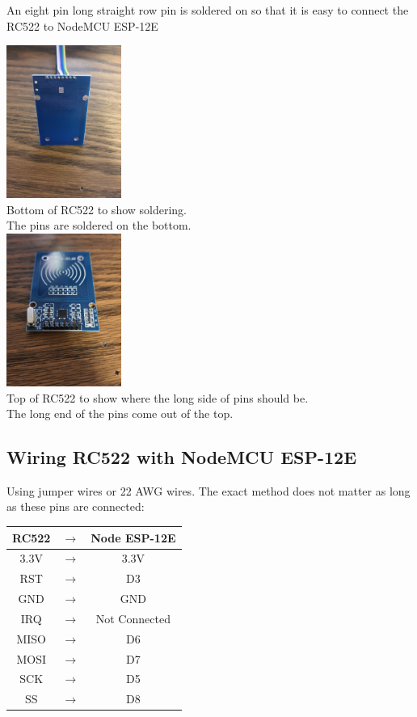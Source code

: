 \documentclass[12pt]{article}
\begin{document}
\begin{spacing}{1.2}
An eight pin long straight row pin is soldered on so that it is easy to connect the RC522 to NodeMCU ESP-12E
\begin{center}
\includegraphics[height=5cm, angle=90]{Soldering Pins Bottom.jpg} \\
Bottom of RC522 to show soldering. \\
The pins are soldered on the bottom. \\
\includegraphics[height=5cm, angle = -90]{Soldering Pins Top.jpg} \\
Top of RC522 to show where the long side of pins should be. \\
The long end of the pins come out of the top. \\
\end{center}

\subsection{Wiring RC522 with NodeMCU ESP-12E}

Using jumper wires or 22 AWG wires. The exact method does not matter as long as these pins are connected:

\begin{center}
\begin{tabular}{ |c c c| }
\hline
RC522 & $\longrightarrow$ & Node ESP-12E \\
\hline \hline
3.3V & $\longrightarrow$ & 3.3V \\
\hline
RST & $\longrightarrow$ & D3 \\
\hline
GND & $\longrightarrow$ & GND \\
\hline
IRQ & $\longrightarrow$ & Not Connected \\
\hline
MISO & $\longrightarrow$ & D6 \\
\hline
MOSI & $\longrightarrow$ & D7 \\ 
\hline
SCK & $\longrightarrow$ & D5 \\
\hline
SS & $\longrightarrow$ & D8 \\
\hline
\end{tabular}
\end{center}


\end{spacing}
\end{document}
